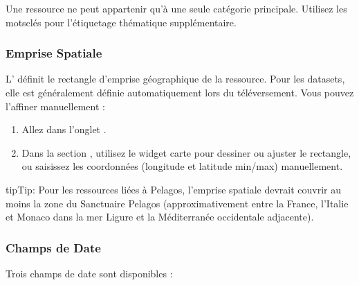\documentclass[letterpaper,10pt,english]{sphinxmanual}
\begin{document}
\sphinxAtStartPar
Une ressource ne peut appartenir qu’à une seule catégorie principale. Utilisez les
mots\sphinxhyphen{}clés pour l’étiquetage thématique supplémentaire.


\subsubsection{Emprise Spatiale}
\label{\detokenize{fr/03_gerer_metadonnees:emprise-spatiale}}
\sphinxAtStartPar
L’ définit le rectangle d’emprise géographique de la ressource.
Pour les datasets, elle est généralement définie automatiquement lors du téléversement.
Vous pouvez l’affiner manuellement :
\begin{enumerate}
%
\item {} 
\sphinxAtStartPar
Allez dans l’onglet .

\item {} 
\sphinxAtStartPar
Dans la section , utilisez le widget carte pour dessiner ou
ajuster le rectangle, ou saisissez les coordonnées (longitude et latitude min/max)
manuellement.

\end{enumerate}

\begin{sphinxadmonition}{tip}{Tip:}
\sphinxAtStartPar
Pour les ressources liées à Pelagos, l’emprise spatiale devrait couvrir au moins
la zone du Sanctuaire Pelagos (approximativement entre la France, l’Italie et Monaco
dans la mer Ligure et la Méditerranée occidentale adjacente).
\end{sphinxadmonition}


\subsubsection{Champs de Date}
\label{\detokenize{fr/03_gerer_metadonnees:champs-de-date}}
\sphinxAtStartPar
Trois champs de date sont disponibles :
\end{document}
